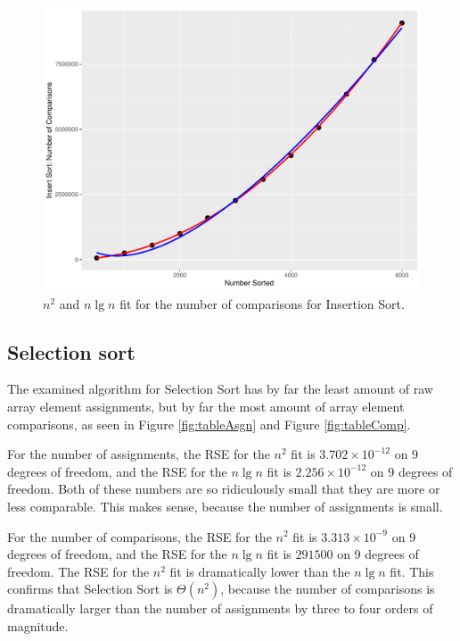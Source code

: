 \documentclass[10pt,fleqn]{article}
\begin{document}
\begin{figure}[h]
    \centering
    \includegraphics[scale=0.3]{CoSc 320 Sort Paper Template/insert-plot-comp.pdf}
    \caption{$n^2$ and $n\lg n$ fit for the number of comparisons for Insertion Sort.}
    \label{fig:insert-plot-comp}
\end{figure}

\subsection{Selection sort}

The examined algorithm for Selection Sort has by far the least amount of raw array element assignments, but by far the most amount of array element comparisons, as seen in Figure \ref{fig:tableAsgn} and Figure \ref{fig:tableComp}.

For the number of assignments, the RSE for the $n^2$ fit is $3.702\times10^{-12}$ on 9 degrees of freedom, and the RSE for the $n \lg n$ fit is $2.256\times10^{-12}$ on 9 degrees of freedom. Both of these numbers are so ridiculously small that they are more or less comparable. This makes sense, because the number of assignments is small.

For the number of comparisons, the RSE for the $n^2$ fit is $3.313\times10^{-9}$ on 9 degrees of freedom, and the RSE for the $n \lg n$ fit is $291500$ on 9 degrees of freedom. The RSE for the $n^2$ fit is dramatically lower than the $n \lg n$ fit. This confirms that Selection Sort is $\Theta(n^2)$, because the number of comparisons is dramatically larger than the number of assignments by three to four orders of magnitude. 
\end{document}
